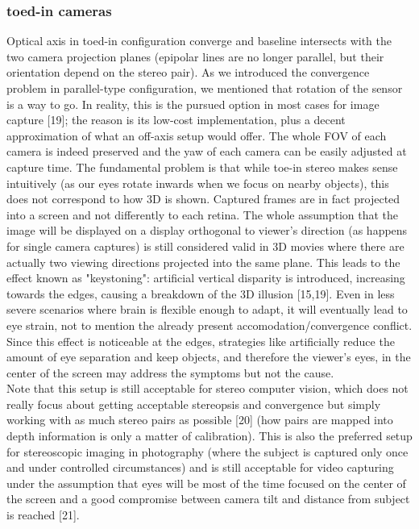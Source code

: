 \subsubsection{toed-in cameras}
Optical axis in toed-in configuration converge and baseline intersects with the two camera projection planes (epipolar lines are no longer parallel, but their orientation depend on the stereo pair). As we introduced the convergence problem in parallel-type configuration, we mentioned that rotation of the sensor is a way to go. In reality, this is the pursued option in most cases for image capture [19]; the reason is its low-cost implementation, plus a decent approximation of what an off-axis setup would offer. The whole FOV of each camera is indeed preserved and the yaw of each camera can be easily adjusted at capture time. The fundamental problem is that while toe-in stereo makes sense intuitively (as our eyes rotate inwards when we focus on nearby objects), this does not correspond to how 3D is shown. Captured frames are in fact projected into a screen and not differently to each retina. The whole assumption that the image will be displayed on a display orthogonal to viewer’s direction (as happens for single camera captures) is still considered valid in 3D movies where there are actually two viewing directions projected into the same plane. This leads to the effect known as "keystoning": artificial vertical disparity is introduced, increasing towards the edges, causing a breakdown of the 3D illusion [15,19]. Even in less severe scenarios where brain is flexible enough to adapt, it will eventually lead to eye strain, not to mention the already present accomodation/convergence conflict. Since this effect is noticeable at the edges, strategies like artificially reduce the amount of eye separation and keep objects, and therefore the viewer’s eyes, in the center of the screen may address the symptoms but not the cause.\\
Note that this setup is still acceptable for stereo computer vision, which does not really focus about getting acceptable stereopsis and convergence but simply working with as much stereo pairs as possible [20] (how pairs are mapped into depth information is only a matter of calibration). This is also the preferred setup for stereoscopic imaging in photography (where the subject is captured only once and under controlled circumstances) and is still acceptable for video capturing under the assumption that eyes will be most of the time focused on the center of the screen and a good compromise between camera tilt and distance from subject is reached [21].

